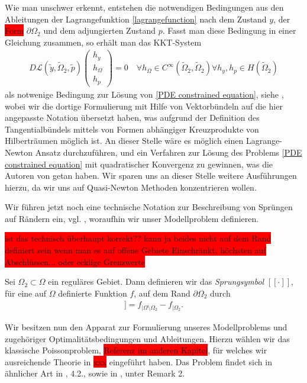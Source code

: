 Wie man unschwer erkennt, entstehen die notwendigen Bedingungen aus den Ableitungen der Lagrangefunktion \ref{lagrangefunction} nach dem Zustand $y$, der \colorbox{red}{Form} $\partial\Omega_2$ und dem adjungierten Zustand $p$. Fasst man diese Bedingung in einer Gleichung zusammen, so erhält man das KKT-System
\begin{align*}
	D\mathcal{L}(\tilde{y},\tilde{\Omega}_2,\tilde{p})\left(
	\begin{matrix}
	h_y \\
	h_{\Omega} \\
	h_p
	\end{matrix}\right)	 = 0 \quad \forall h_{\Omega} \in C^{\infty}(\tilde{\Omega}_2,\tilde{\Omega}_2)
	\forall h_y, h_p \in H(\tilde{\Omega}_2)
\end{align*}
als notwenige Bedingung zur Lösung von \ref{PDE constrained equation}, siehe \cite{LagrangeNewton}, wobei wir die dortige Formulierung mit Hilfe von Vektorbündeln auf die hier angepasste Notation übersetzt haben, was aufgrund der Definition des Tangentialbündels mittels von Formen abhängiger Kreuzprodukte von Hilberträumen  möglich ist. An dieser Stelle wäre es möglich einen Lagrange-Newton Ansatz durchzuführen, und ein Verfahren zur Lösung des Problems \ref{PDE constrained equation} mit quadratischer Konvergenz zu gewinnen, was die Autoren von \cite{LagrangeNewton} getan haben. Wir sparen uns an dieser Stelle weitere Ausführungen hierzu, da wir uns auf Quasi-Newton Methoden konzentrieren wollen.

Wir führen jetzt noch eine technische Notation zur Beschreibung von Sprüngen auf Rändern ein, vgl. \cite{LagrangeNewton}, woraufhin wir unser Modellproblem definieren.

\colorbox{red}{ist das technisch überhaupt korrekt?? kann ja beides nicht auf dem Rand definiert sein wenn man es auf offene Gebiete Einschränkt, höchsten auf Abschlüssen... oder ecklige Grenzwerte}
\begin{defi}
	Sei $\Omega_2 \subset \Omega$ ein reguläres Gebiet. Dann definieren wir das \textit{Sprungsymbol} $[[\cdot]]$, für eine auf $\Omega$ definierte Funktion $f$, auf dem Rand $\partial\Omega_2$ durch
	\begin{align*}
		[[f]] = f_{\vert \Omega \setminus \Omega_2} - f_{\vert \Omega_2}.
	\end{align*}
\end{defi}

Wir besitzen nun den Apparat zur Formulierung unseres Modellproblems und zugehöriger Optimalitätsbedingungen und Ableitungen. Hierzu wählen wir das klassische Poissonproblem, \colorbox{red}{Referenz im anderen Kapitel}, für welches wir ausreichende Theorie in \colorbox{red}{xxx} eingeführt haben. Das Problem findet sich in ähnlicher Art in \cite{shape_space}, 4.2., sowie in \cite{Lagrange-Newton}, unter Remark 2.


